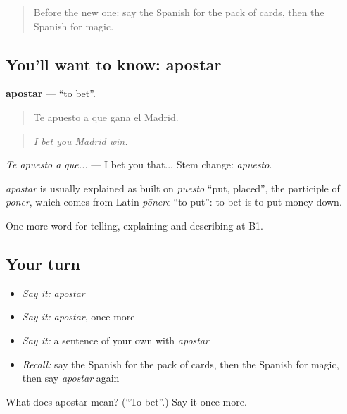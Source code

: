 \begin{quote}
Before the new one: say the Spanish for the pack of cards, then the Spanish for magic.
\end{quote}

\subsection*{You'll want to know: apostar}
\textbf{apostar} — \textquotedblleft{}to bet\textquotedblright{}.

\begin{quote}
Te apuesto a que gana el Madrid.
\end{quote}

\begin{quote}
\emph{I bet you Madrid win.}
\end{quote}

\emph{Te apuesto a que...} — I bet you that... Stem change: \emph{apuesto}.

\begin{cousinweb}
\emph{apostar} is usually explained as built on \emph{puesto} \textquotedblleft{}put, placed\textquotedblright{}, the participle of \emph{poner}, which comes from Latin \emph{pōnere} \textquotedblleft{}to put\textquotedblright{}: to bet is to put money down.
\end{cousinweb}

\begin{grammarlens}[title={What you've built}]
One more word for telling, explaining and describing at B1.
\end{grammarlens}

\subsection*{Your turn}
\begin{itemize}
\raggedright
  \item \emph{Say it:} \emph{apostar}
  \item \emph{Say it:} \emph{apostar}, once more
  \item \emph{Say it:} a sentence of your own with \emph{apostar}
  \item \emph{Recall:} say the Spanish for the pack of cards, then the Spanish for magic, then say \emph{apostar} again
\end{itemize}

\begin{tcolorbox}[breakable,colback=teal!4,colframe=teal!35!black,title={Before you move on}]
What does apostar mean? (\textquotedblleft{}To bet\textquotedblright{}.) Say it once more.
\end{tcolorbox}
